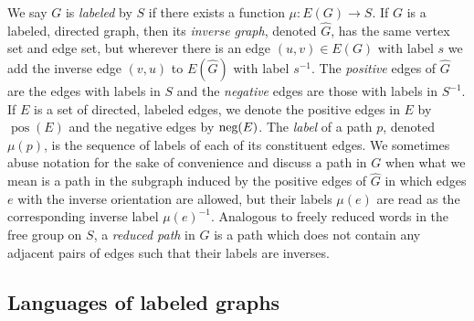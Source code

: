 \documentclass{article}
\DeclareMathOperator{\pos}{pos}
\newcommand{\nega}{\textnormal{neg}}
\begin{document}
We say $G$ is \emph{labeled} by $S$ if there exists a function $\mu \colon E(G) \to S$.
If $G$ is a labeled, directed graph, then its \emph{inverse graph}, denoted $\hat{G}$, has the same vertex set and edge set, but wherever there is an edge $(u, v) \in E(G)$ with label $s$ we add the inverse edge $(v, u)$ to $E(\hat{G})$ with label $s^{-1}$.
The \emph{positive} edges of $\hat{G}$ are the edges with labels in $S$ and the \emph{negative} edges are those with labels in $S^{-1}$.
If $E$ is a set of directed, labeled edges, we denote the positive edges in $E$ by $\pos(E)$ and the negative edges by $\nega(E)$.
The \emph{label} of a path $p$, denoted $\mu(p)$, is the sequence of labels of each of its constituent edges.
We sometimes abuse notation for the sake of convenience and discuss a path in $G$ when what we mean is a path in the subgraph induced by the positive edges of $\hat{G}$ in which edges $e$ with the inverse orientation are allowed, but their labels $\mu(e)$ are read as the corresponding inverse label $\mu(e)^{-1}$.
Analogous to freely reduced words in the free group on $S$, a \emph{reduced path} in $G$ is a path which does not contain any adjacent pairs of edges such that their labels are inverses.

\subsection{Languages of labeled graphs}
\end{document}
